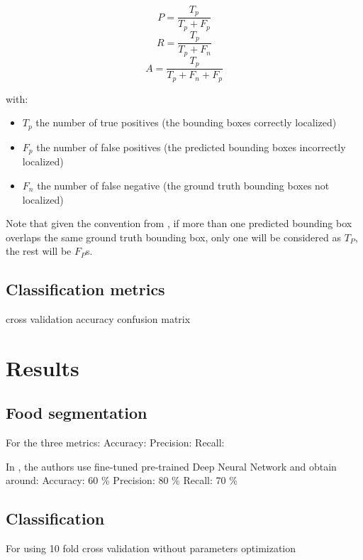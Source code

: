 $$ P =  \frac{T_p}{T_p + F_p}$$
$$ R =  \frac{T_p}{T_p + F_n}$$
$$ A = \frac{T_p}{T_p + F_n + F_p} $$

with:
\begin{itemize}
   \item $T_p$ the number of true positives (the bounding boxes correctly localized)
   \item $F_p$ the number of false positives (the predicted bounding boxes incorrectly localized)
   \item $F_n$ the number of false negative (the ground truth bounding boxes not localized)
\end{itemize}

Note that given the convention from \cite{pascalVoc2012}, if more than one predicted bounding box overlaps the same ground truth bounding box, only one will be considered as $T_P$, the rest will be $F_P$s.

\subsection{Classification metrics}

cross validation
accuracy
confusion matrix

\section{Results}
\subsection{Food segmentation}

For the three metrics:
Accuracy:
Precision:
Recall:

In \cite{Bolanos2016}, the authors use fine-tuned pre-trained Deep Neural Network and obtain around:
Accuracy: 60 \%
Precision: 80 \%
Recall: 70 \%

\subsection{Classification}

For using 10 fold cross validation
without parameters optimization

